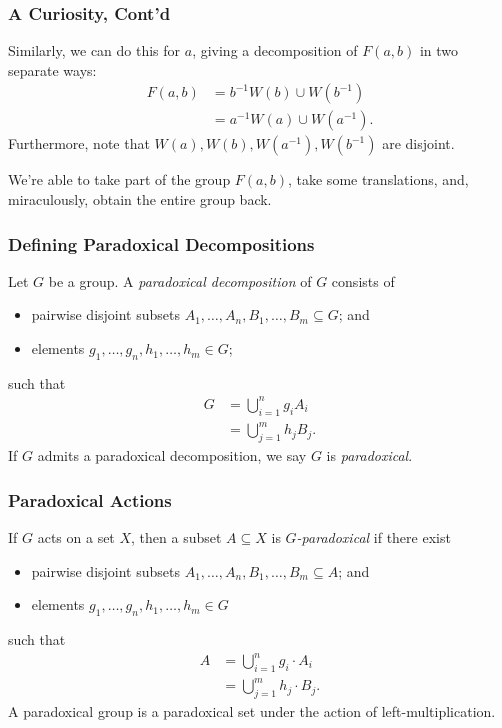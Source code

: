 \documentclass{beamer-custom}
\begin{document}
\begin{frame}
  \frametitle{A Curiosity, Cont'd}
  Similarly, we can do this for $a$, giving a decomposition of $F(a,b)$ in two separate ways:
  \begin{align*}
    F(a,b) &= b^{-1}W(b)\cup W\left( b^{-1} \right)\\
           &= a^{-1}W(a)\cup W\left( a^{-1} \right).
  \end{align*}\pause
  Furthermore, note that $W\left( a \right),W\left( b \right),W\left( a^{-1} \right),W\left( b^{-1} \right)$ are disjoint.\pause\newline

  We're able to take part of the group $F(a,b)$, take some translations, and, miraculously, obtain the entire group back.
\end{frame}
\begin{frame}
  \frametitle{Defining Paradoxical Decompositions}
  Let $G$ be a group. A \textit{paradoxical decomposition} of $G$ consists of
  \begin{itemize}
    \item pairwise disjoint subsets $A_1,\dots,A_n,B_1,\dots,B_m\subseteq G$; and
    \item elements $g_1,\dots,g_n,h_1,\dots,h_m\in G$;
  \end{itemize}
  such that
  \begin{align*}
    G &= \bigcup_{i=1}^{n}g_iA_i\\
      &= \bigcup_{j=1}^{m}h_jB_j.
  \end{align*}\pause
  If $G$ admits a paradoxical decomposition, we say $G$ is \textit{paradoxical}.
\end{frame}
\begin{frame}
  \frametitle{Paradoxical Actions}
  If $G$ acts on a set $X$, then a subset $A\subseteq X$ is \textit{$G$-paradoxical} if there exist
  \begin{itemize}
    \item pairwise disjoint subsets $A_1,\dots,A_n,B_1,\dots,B_m\subseteq A$; and
    \item elements $g_1,\dots,g_n,h_1,\dots,h_m\in G$
  \end{itemize}
  such that
  \begin{align*}
    A &= \bigcup_{i=1}^{n}g_i\cdot A_i\\
      &= \bigcup_{j=1}^{m}h_j\cdot B_j.
  \end{align*}\pause
  A paradoxical group is a paradoxical set under the action of left-multiplication.
\end{frame}
\end{document}
